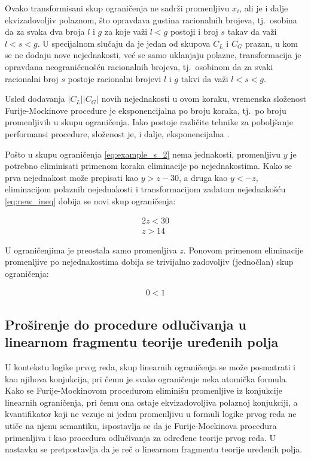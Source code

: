 \documentclass[a4paper,10pt]{article}
\begin{document}
Ovako transformisani skup ograničenja ne sadrži promenljivu $x_i$, ali je i dalje ekvizadovoljiv polaznom, što opravdava gustina racionalnih brojeva, tj.~osobina da za svaka dva broja $l$ i $g$ za koje važi $l < g$ postoji i broj $s$ takav da važi $l < s < g$. U specijalnom slučaju da je jedan od skupova $C_L$ i $C_G$ prazan, u kom se ne dodaju nove nejednakosti, već se samo uklanjaju polazne, transformacija je opravdana neograničenošću racionalnih brojeva, tj.~osobinom da za svaki racionalni broj $s$ postoje racionalni brojevi $l$ i $g$ takvi da važi $l < s < g$.

Usled dodavanja $|C_L||C_G|$ novih nejednakosti u ovom koraku, vremenska složenost Furije-Mockinove procedure je eksponencijalna po broju koraka, tj.~po broju promenljivih u skupu ograničenja. Iako postoje različite tehnike za poboljšanje performansi procedure, složenost je, i dalje, eksponencijalna \cite{complexity-estimates-fourier-motzkin}.

Pošto u skupu ograničenja \eqref{eq:example_s_2} nema jednakosti, promenljivu $y$ je potrebno eliminisati primenom koraka eliminacije po nejednakostima. Kako se prva nejednakost može prepisati kao $y > z - 30$, a druga kao $y < -z$, eliminacijom polaznih nejednakosti i transformacijom zadatom nejednakošću \eqref{eq:new_ineq} dobija se novi skup ograničenja:

\begin{equation}
\begin{gathered}
    \label{eq:example_s_3}
    2z < 30 \\
    z > 14
\end{gathered}
\end{equation}

U ograničenjima je preostala samo promenljiva $z$. Ponovom primenom eliminacije promenljive po nejednakostima dobija se trivijalno zadovoljiv (jednočlan) skup ograničenja:

\begin{equation}
\begin{gathered}
    \label{eq:example_s_4}
    0 < 1
\end{gathered}
\end{equation}

\subsection{Proširenje do procedure odlučivanja u linearnom fragmentu teorije uređenih polja}

U kontekstu logike prvog reda, skup linearnih ograničenja se može posmatrati i kao njihova konjukcija, pri čemu je svako ograničenje neka atomička formula. Kako se Furije-Mockinovom procedurom eliminišu promenljive iz konjukcije linearnih ograničenja, pri čemu ona ostaje ekvizadovoljiva polaznoj konjukciji, a kvantifikator koji ne vezuje ni jednu promenljivu u formuli logike prvog reda ne utiče na njenu semantiku, ispostavlja se da je Furije-Mockinova procedura primenljiva i kao procedura odlučivanja za određene teorije prvog reda. U nastavku se pretpostavlja da je reč o linearnom fragmentu teorije uređenih polja.
\end{document}
